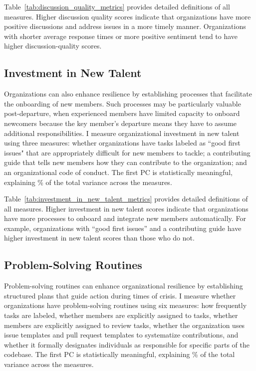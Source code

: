\documentclass[12pt,notitlepage]{article}
\begin{document}
Table~\ref{tab:discussion_quality_metrics} provides detailed definitions of all \DiscussionMeasureCount{} measures.
Higher discussion quality scores indicate that organizations have more positive discussions and address issues in a more timely manner. 
Organizations with shorter average response times or more positive sentiment tend to have higher discussion-quality scores.

\subsection{Investment in New Talent}
Organizations can also enhance resilience by establishing processes that facilitate the onboarding of new members.
Such processes may be particularly valuable post-departure, when experienced members have limited capacity to onboard newcomers because the key member's departure means they have to assume additional responsibilities. 
I measure organizational investment in new talent using three measures: whether organizations have tasks labeled as ``good first issues" that are appropriately difficult for new members to tackle; a contributing guide that tells new members how they can contribute to the organization; and an organizational code of conduct. 
The first PC is statistically meaningful, explaining \TalentVarianceExplained\% of the total variance across the \TalentMeasureCount{} measures.

Table~\ref{tab:investment_in_new_talent_metrics} provides detailed definitions of all \TalentMeasureCount{} measures.
Higher investment in new talent scores indicate that organizations have more processes to onboard and integrate new members automatically. 
For example, organizations with ``good first issues'' and a contributing guide have higher investment in new talent scores than those who do not. 

\subsection{Problem-Solving Routines}
Problem-solving routines can enhance organizational resilience by establishing structured plans that guide action during times of crisis.
I measure whether organizations have problem-solving routines using six measures: how frequently tasks are labeled, whether members are explicitly assigned to tasks, whether members are explicitly assigned to review tasks, whether the organization uses issue templates and pull request templates to systematize contributions, and whether it formally designates individuals as responsible for specific parts of the codebase.
The first PC is statistically meaningful, explaining \RoutinesVarianceExplained\% of the total variance across the \RoutinesMeasureCount{} measures.
\end{document}
